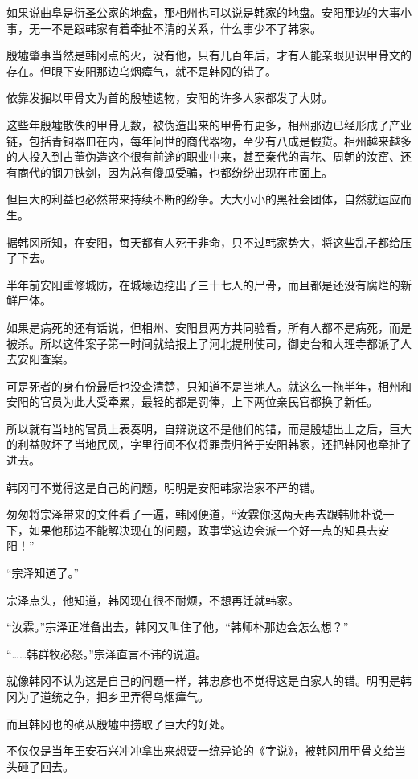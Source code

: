 如果说曲阜是衍圣公家的地盘，那相州也可以说是韩家的地盘。安阳那边的大事小事，无一不是跟韩家有着牵扯不清的关系，什么事少不了韩家。

殷墟肇事当然是韩冈点的火，没有他，只有几百年后，才有人能亲眼见识甲骨文的存在。但眼下安阳那边乌烟瘴气，就不是韩冈的错了。

依靠发掘以甲骨文为首的殷墟遗物，安阳的许多人家都发了大财。

这些年殷墟散佚的甲骨无数，被伪造出来的甲骨冇更多，相州那边已经形成了产业链，包括青铜器皿在内，每年问世的商代器物，至少有八成是假货。相州越来越多的人投入到古董伪造这个很有前途的职业中来，甚至秦代的青花、周朝的汝窑、还有商代的钢刀铁剑，因为总有傻瓜受骗，也都纷纷出现在市面上。

但巨大的利益也必然带来持续不断的纷争。大大小小的黑社会团体，自然就运应而生。

据韩冈所知，在安阳，每天都有人死于非命，只不过韩家势大，将这些乱子都给压了下去。

半年前安阳重修城防，在城壕边挖出了三十七人的尸骨，而且都是还没有腐烂的新鲜尸体。

如果是病死的还有话说，但相州、安阳县两方共同验看，所有人都不是病死，而是被杀。所以这件案子第一时间就给报上了河北提刑使司，御史台和大理寺都派了人去安阳查案。

可是死者的身冇份最后也没查清楚，只知道不是当地人。就这么一拖半年，相州和安阳的官员为此大受牵累，最轻的都是罚俸，上下两位亲民官都换了新任。

所以就有当地的官员上表奏明，自辩说这不是他们的错，而是殷墟出土之后，巨大的利益败坏了当地民风，字里行间不仅将罪责归咎于安阳韩家，还把韩冈也牵扯了进去。

韩冈可不觉得这是自己的问题，明明是安阳韩家治家不严的错。

匆匆将宗泽带来的文件看了一遍，韩冈便道，“汝霖你这两天再去跟韩师朴说一下，如果他那边不能解决现在的问题，政事堂这边会派一个好一点的知县去安阳！”

“宗泽知道了。”

宗泽点头，他知道，韩冈现在很不耐烦，不想再迁就韩家。

“汝霖。”宗泽正准备出去，韩冈又叫住了他，“韩师朴那边会怎么想？”

“……韩群牧必怒。”宗泽直言不讳的说道。

就像韩冈不认为这是自己的问题一样，韩忠彦也不觉得这是自家人的错。明明是韩冈为了道统之争，把乡里弄得乌烟瘴气。

而且韩冈也的确从殷墟中捞取了巨大的好处。

不仅仅是当年王安石兴冲冲拿出来想要一统异论的《字说》，被韩冈用甲骨文给当头砸了回去。

